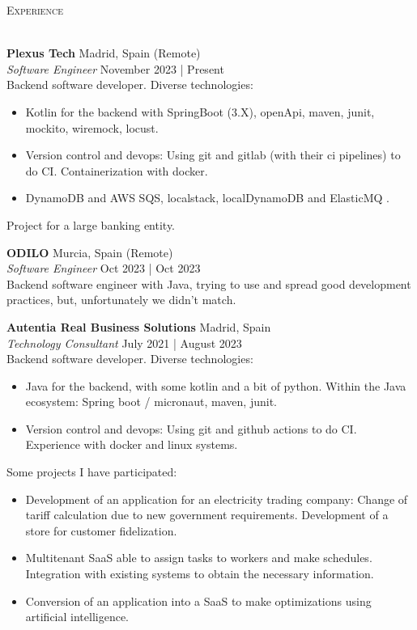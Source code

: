 \documentclass[a4paper]{article}
\newcommand{\lineunder} {
    \vspace*{-8pt} \\
    \hspace*{-18pt} \hrulefill \\
}
\newcommand{\header} [1] {
    {\hspace*{-18pt}\vspace*{6pt} \textsc{#1}}
    \vspace*{-6pt} \lineunder
}
\begin{document}
\header{Experience}
\vspace{1mm}

\textbf{Plexus Tech} \hfill Madrid, Spain (Remote)\\
\textit{Software Engineer} \hfill November 2023 | Present\\
\vspace{-1mm}
Backend software developer. Diverse technologies:

\begin{itemize} \itemsep 1pt
\item Kotlin for the backend with SpringBoot (3.X), openApi, maven, junit, mockito, wiremock, locust.
\item Version control and devops: Using git and gitlab (with their ci pipelines) to do CI. Containerization with docker.
\item DynamoDB and AWS SQS, localstack, localDynamoDB and ElasticMQ .
\end{itemize}

Project for a large banking entity.


\textbf{ODILO} \hfill Murcia, Spain (Remote)\\
\textit{Software Engineer} \hfill Oct 2023 | Oct 2023\\
\vspace{-1mm}
Backend software engineer with Java, trying to use and spread good development practices, but, unfortunately we didn't match.


\textbf{Autentia Real Business Solutions} \hfill Madrid, Spain\\
\textit{Technology Consultant} \hfill July 2021 | August 2023\\
\vspace{-1mm}
Backend software developer. Diverse technologies:

\begin{itemize} \itemsep 1pt
\item Java for the backend, with some kotlin and a bit of python. Within the Java ecosystem: Spring boot / micronaut, maven, junit.
\item Version control and devops: Using git and github actions to do CI. Experience with docker and linux systems.
\end{itemize}

Some projects I have participated:

\begin{itemize} \itemsep 1pt

\item Development of an application for an electricity trading company: Change of tariff calculation due to new government requirements. Development of a store for customer fidelization.
\item Multitenant SaaS able to assign tasks to workers and make schedules. Integration with existing systems to obtain the necessary information.
\item Conversion of an application into a SaaS to make optimizations using artificial intelligence.
\end{itemize}
\end{document}
